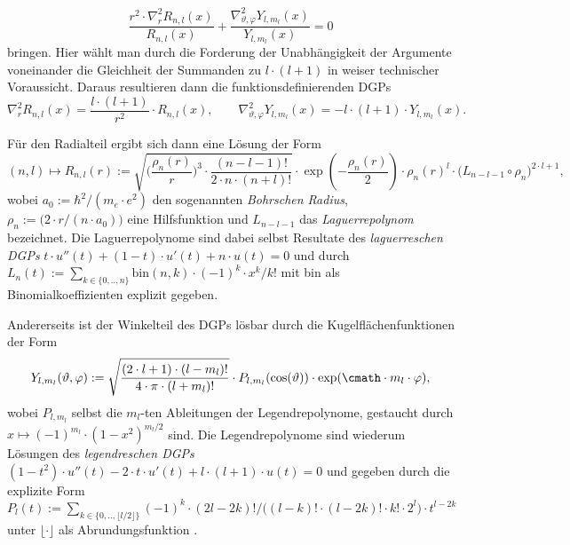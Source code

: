 \documentclass[../main.tex]{subfiles}
\begin{document}
            \[
                \frac{r^2\cdot \nabla^2_r R_{n,l}(x)}{R_{n,l}(x)} + \frac{\nabla^2_{\vartheta,\varphi} Y_{l,m_l}(x)}{Y_{l,m_l}(x)} = 0
            \]
            bringen. Hier wählt man durch die Forderung der Unabhängigkeit der Argumente voneinander die Gleichheit der Summanden zu $l\cdot (l + 1)$ in weiser technischer Voraussicht. Daraus resultieren dann die funktionsdefinierenden DGPs
            \[
                \nabla^2_r R_{n,l}(x) = \frac{l\cdot (l + 1)}{r^2}\cdot R_{n,l}(x),\qquad \nabla^2_{\vartheta,\varphi} Y_{l,m_l}(x) = -l\cdot (l + 1)\cdot Y_{l,m_l}(x).
            \]
            \begin{shaded}
                \noindent Für den Radialteil ergibt sich dann eine Lösung der Form
                \[
                    (n,l)\mapsto R_{n,l}(r) := \sqrt{
                        \biggl(\frac{\rho_n(r)}{r}\biggr)^3\cdot\frac{(n - l - 1)!}{2\cdot n\cdot (n + l)!}
                    }\cdot\exp(-\frac{\rho_n(r)}{2})\cdot\rho_n(r)^l\cdot \bigl(L_{n - l - 1}\circ\rho_n\bigr)^{2\cdot l + 1},
                \]
                wobei $a_0:=\hbar^2/(m_e\cdot e^2)$ den sogenannten \emph{Bohrschen Radius}, $\rho_n:=\bigl(2\cdot r/(n\cdot a_0)\bigr)$ eine Hilfsfunktion und $L_{n - l - 1}$ das \emph{Laguerrepolynom} bezeichnet. Die Laguerrepolynome sind dabei selbst Resultate des \emph{laguerreschen DGPs} $t\cdot u''(t) + (1-t)\cdot u'(t) + n\cdot u(t) = 0$ und durch $L_n(t) := \sum_{k\in\{0,..,n\}}\text{bin}(n,k)\cdot(-1)^k\cdot x^k/k!$ mit bin als Binomialkoeffizienten explizit gegeben. 

                Andererseits ist der Winkelteil des DGPs lösbar durch die Kugelflächenfunktionen der Form
                \[
                    Y_{l,m_l}(\vartheta,\varphi) := \sqrt{\frac{(2\cdot l + 1)\cdot (l - m_l)!}{4\cdot\pi\cdot (l + m_l)!}}\cdot P_{l,m_l}(\cos(\vartheta))\cdot\exp(\cmath\cdot m_l\cdot\varphi),
                \]
                wobei $P_{l,m_l}$ selbst die $m_l$-ten Ableitungen der Legendrepolynome, gestaucht durch $x\mapsto (-1)^{m_l}\cdot(1-x^2)^{{m_l}/2}$ sind. Die Legendrepolynome sind wiederum Lösungen des \emph{legendreschen DGPs} $(1-t^2)\cdot u''(t) - 2\cdot t\cdot u'(t) + l\cdot (l + 1)\cdot u(t) = 0$ und gegeben durch die explizite Form $P_l(t) := \sum_{k\in\{0,..,\lfloor l/2\rfloor\}}(-1)^k\cdot(2l - 2k)!/\bigl((l - k)!\cdot (l - 2k)!\cdot k!\cdot 2^l\bigr)\cdot t^{l-2k}$ unter $\lfloor\cdot\rfloor$ als Abrundungsfunktion \cite{wiki:Laguerrepolynome,wiki:Kugelflaechenfunktionen,wiki:zugeordneteLegendrepolynome,wiki:Legendrepolynome,wiki:BohrRadius,git:IK4T}.
            \end{shaded}
            
\end{document}
